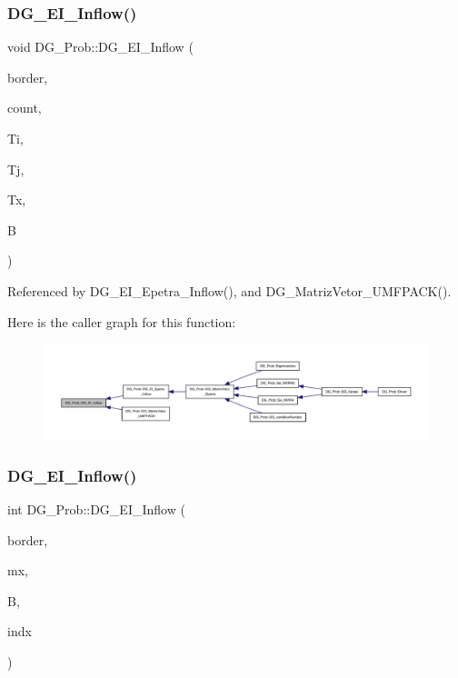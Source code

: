 \subsubsection{\texorpdfstring{D\+G\+\_\+\+E\+I\+\_\+\+Inflow()}{DG\_EI\_Inflow()}\hspace{0.1cm}{\footnotesize\ttfamily [1/2]}}
{\footnotesize\ttfamily void D\+G\+\_\+\+Prob\+::\+D\+G\+\_\+\+E\+I\+\_\+\+Inflow (\begin{DoxyParamCaption}\item[{const \hyperlink{structEDGE}{E\+D\+GE}}]{border,  }\item[{int \&}]{count,  }\item[{int $\ast$}]{Ti,  }\item[{int $\ast$}]{Tj,  }\item[{double $\ast$}]{Tx,  }\item[{double $\ast$}]{B }\end{DoxyParamCaption})}



Referenced by D\+G\+\_\+\+E\+I\+\_\+\+Epetra\+\_\+\+Inflow(), and D\+G\+\_\+\+Matriz\+Vetor\+\_\+\+U\+M\+F\+P\+A\+C\+K().

Here is the caller graph for this function\+:
\nopagebreak
\begin{figure}[H]
\begin{center}
\leavevmode
\includegraphics[width=350pt]{classDG__Prob_a6e6d838559f53cff2a917c3e9a5111ba_icgraph}
\end{center}
\end{figure}
\mbox{\label{classDG__Prob_ae722c0b7a7d1bccc9dbc9d2333754b42}} 
\subsubsection{\texorpdfstring{D\+G\+\_\+\+E\+I\+\_\+\+Inflow()}{DG\_EI\_Inflow()}\hspace{0.1cm}{\footnotesize\ttfamily [2/2]}}
{\footnotesize\ttfamily int D\+G\+\_\+\+Prob\+::\+D\+G\+\_\+\+E\+I\+\_\+\+Inflow (\begin{DoxyParamCaption}\item[{const \hyperlink{structEDGE}{E\+D\+GE}}]{border,  }\item[{double $\ast$}]{mx,  }\item[{double $\ast$}]{B,  }\item[{int $\ast$}]{indx }\end{DoxyParamCaption})}



